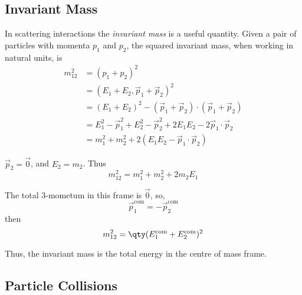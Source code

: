 \subsection{Invariant Mass}
\label{sec:invariant-mass}

In scattering interactions the \emph{invariant mass} is a useful
quantity. Given a pair of particles with momenta $p_1$ and $p_2$, the
squared invariant mass, when working in natural units, is
\begin{align}
m_{12}^2  & = (p_1 + p_2)^2 \nonumber                                                                      \\
         & = (E_1+E_2, \vec{p}_1 + \vec{p}_2)^2 \nonumber                                                 \\
         & = (E_1+E_2)^2 - (\vec{p}_1 + \vec{p}_2) \cdot (\vec{p}_1 + \vec{p}_2) \nonumber                \\
         & = E_1^2 - \vec{p}_1^2 + E_2^2 - \vec{p}_2^2 + 2E_1 E_2 - 2 \vec{p}_1 \cdot \vec{p}_2 \nonumber \\
         & = m_1^2 + m_2^2 + 2(E_1 E_2 - \vec{p}_1 \cdot \vec{p}_2) 
\end{align}

\begin{example}
  $\vec{p}_2 = \vec{0}$, and $E_2 = m_2$. Thus
\[ m_{12}^2 = m_1^2 + m_2^2 + 2 m_2 E_1 \]
\end{example}
\begin{example}
  The total 3-mometum in this frame is $\vec{0}$, so,
  \[ \vec{p}^{\text{com}}_1 = - \vec{p}^{\text{com}}_2 \]
then
\[ m_{12}^2 = \qty( E_1^{\text{com}} + E_2^{\text{com}} )^2 \]
\end{example}
Thus, the invariant mass is the total energy in the centre of mass
frame.

\subsection{Particle Collisions}
\label{sec:particle-collisions}

